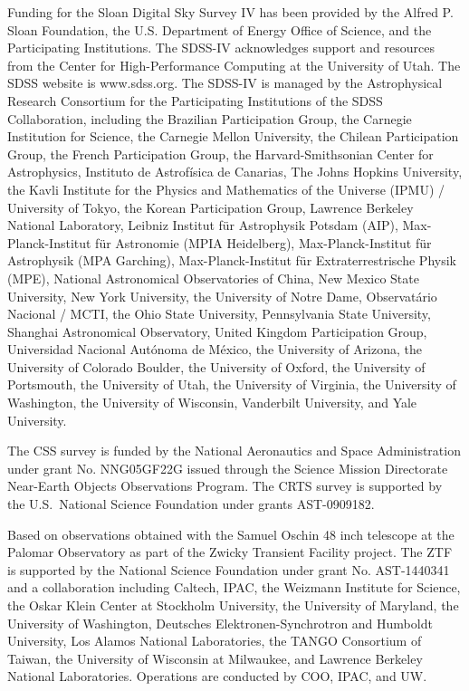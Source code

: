 \documentclass[twocolumn]{aastex62}
\begin{document}
Funding for the Sloan Digital Sky Survey IV has been provided by the Alfred P. Sloan Foundation, the U.S. Department of Energy Office of Science, and the Participating Institutions. The SDSS-IV acknowledges support and resources from the Center for High-Performance Computing at
the University of Utah. The SDSS website is www.sdss.org. The SDSS-IV is managed by the Astrophysical Research Consortium for the  Participating Institutions of the SDSS Collaboration, including the  Brazilian Participation Group, the Carnegie Institution for Science, the Carnegie Mellon University, the Chilean Participation Group, the French Participation Group, the Harvard-Smithsonian Center for Astrophysics, Instituto de Astrof\'isica de Canarias, The Johns Hopkins University, the Kavli Institute for the Physics and Mathematics of the Universe (IPMU) / 
University of Tokyo, the Korean Participation Group, Lawrence Berkeley National Laboratory, 
Leibniz Institut f\"ur Astrophysik Potsdam (AIP),  Max-Planck-Institut f\"ur Astronomie (MPIA Heidelberg), Max-Planck-Institut f\"ur Astrophysik (MPA Garching), Max-Planck-Institut f\"ur Extraterrestrische Physik (MPE), National Astronomical Observatories of China, New Mexico State University, New York University, the University of Notre Dame, Observat\'ario Nacional / MCTI, the Ohio State University, Pennsylvania State University, Shanghai Astronomical Observatory, 
United Kingdom Participation Group, Universidad Nacional Aut\'onoma de M\'exico, the University of Arizona, the University of Colorado Boulder, the University of Oxford, the University of Portsmouth, 
the University of Utah, the University of Virginia, the University of Washington, the University of Wisconsin, Vanderbilt University, and Yale University.

The CSS survey is funded by the National Aeronautics and Space Administration under grant No. NNG05GF22G issued through the Science Mission Directorate Near-Earth Objects Observations Program.  The CRTS survey is supported by the U.S.~National Science Foundation under grants AST-0909182.

Based on observations obtained with the Samuel Oschin 48 inch telescope at the Palomar Observatory as part of the Zwicky Transient Facility project. The ZTF is supported by the National Science Foundation under grant No. AST-1440341 and a collaboration including Caltech, IPAC, the Weizmann Institute for Science, the Oskar Klein Center at Stockholm University, the University of Maryland, the University of Washington, Deutsches Elektronen-Synchrotron and Humboldt University, Los Alamos National Laboratories, the TANGO Consortium of Taiwan, the University of Wisconsin at Milwaukee, and Lawrence Berkeley National Laboratories. Operations are conducted by COO, IPAC, and UW.
\end{document}
